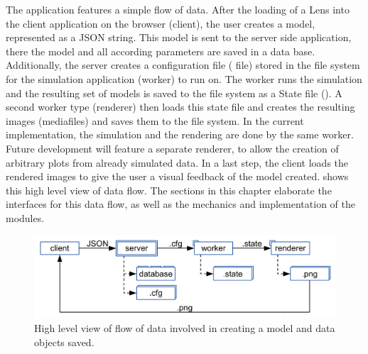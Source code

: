 The application features a simple flow of data.
After the loading of a Lens into the client application on the browser (client), the user creates a model, represented as a JSON string.
This model is sent to the server side application, there the model and all according parameters are saved in a data base.
Additionally, the server creates a configuration file ( file) stored in the file system for the simulation application (worker) to run on.
The worker runs the simulation and the resulting set of models is saved to the file system as a State file ().
A second worker type (renderer) then loads this state file and creates the resulting images (mediafiles) and saves them to the file system.
In the current implementation, the simulation and the rendering are done by the same worker.
Future development will feature a separate renderer, to allow the creation of arbitrary plots from already simulated data.
In a last step, the client loads the rendered images to give the user a visual feedback of the model created.
 shows this high level view of data flow.
The sections in this chapter elaborate the interfaces for this data flow, as well as the mechanics and implementation of the modules.

\begin{figure}[htbp]
  \centering
    \includegraphics[width=\figwidth]{fig/dataflow.pdf}
  \caption{High level view of flow of data involved in creating a model and data objects saved.}
  \label{fig:dataflow}
\end{figure}



